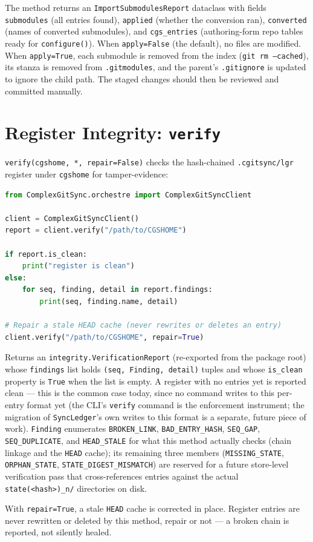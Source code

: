 The method returns an \texttt{ImportSubmodulesReport} dataclass with fields
\texttt{submodules} (all entries found), \texttt{applied} (whether the
conversion ran), \texttt{converted} (names of converted submodules), and
\texttt{cgs\_entries} (authoring-form repo tables ready for
\texttt{configure()}).  When \texttt{apply=False} (the default), no files
are modified.  When \texttt{apply=True}, each submodule is removed from the
index (\texttt{git rm --cached}), its stanza is removed from
\texttt{.gitmodules}, and the parent's \texttt{.gitignore} is updated to
ignore the child path.  The staged changes should then be reviewed and
committed manually.

\section{Register Integrity: \texttt{verify}}

\texttt{verify(cgshome, *, repair=False)} checks the hash-chained
\texttt{.cgitsync/lgr} register under \texttt{cgshome} for tamper-evidence:

\begin{lstlisting}[language=python]
from ComplexGitSync.orchestre import ComplexGitSyncClient

client = ComplexGitSyncClient()
report = client.verify("/path/to/CGSHOME")

if report.is_clean:
    print("register is clean")
else:
    for seq, finding, detail in report.findings:
        print(seq, finding.name, detail)

# Repair a stale HEAD cache (never rewrites or deletes an entry)
client.verify("/path/to/CGSHOME", repair=True)
\end{lstlisting}

Returns an \texttt{integrity.VerificationReport} (re-exported from the
package root) whose \texttt{findings} list holds \texttt{(seq, Finding,
detail)} tuples and whose \texttt{is\_clean} property is \texttt{True} when
the list is empty. A register with no entries yet is reported clean — this
is the common case today, since no command writes to this per-entry format
yet (the CLI's \texttt{verify} command is the enforcement instrument; the
migration of \texttt{SyncLedger}'s own writes to this format is a separate,
future piece of work).  \texttt{Finding} enumerates
\texttt{BROKEN\_LINK}, \texttt{BAD\_ENTRY\_HASH}, \texttt{SEQ\_GAP},
\texttt{SEQ\_DUPLICATE}, and \texttt{HEAD\_STALE} for what this method
actually checks (chain linkage and the \texttt{HEAD} cache); its remaining
three members (\texttt{MISSING\_STATE}, \texttt{ORPHAN\_STATE},
\texttt{STATE\_DIGEST\_MISMATCH}) are reserved for a future store-level
verification pass that cross-references entries against the actual
\texttt{state(<hash>)\_n/} directories on disk.

With \texttt{repair=True}, a stale \texttt{HEAD} cache is corrected in
place. Register entries are never rewritten or deleted by this method,
repair or not — a broken chain is reported, not silently healed.
